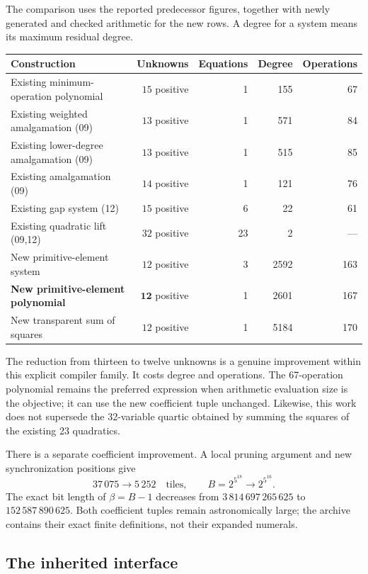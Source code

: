 The comparison uses the reported predecessor figures, together with
newly generated and checked arithmetic for the new rows.  A degree for
a system means its maximum residual degree.
\begin{center}\small
\begin{tabular}{>{\raggedright\arraybackslash}p{54mm}rrrr}
\toprule
Construction & Unknowns & Equations & Degree & Operations\\
\midrule
Existing minimum-operation polynomial & $15$ positive & 1 & 155 & 67\\
Existing weighted amalgamation (09) & $13$ positive & 1 & 571 & 84\\
Existing lower-degree amalgamation (09) & $13$ positive & 1 & 515 & 85\\
Existing amalgamation (09) & $14$ positive & 1 & 121 & 76\\
Existing gap system (12) & $15$ positive & 6 & 22 & 61\\
Existing quadratic lift (09,12) & $32$ positive & 23 & 2 & ---\\
\midrule
New primitive-element system & $12$ positive & 3 & 2592 & 163\\
\textbf{New primitive-element polynomial} & $\mathbf{12}$ positive & 1 & 2601 & 167\\
New transparent sum of squares & $12$ positive & 1 & 5184 & 170\\
\bottomrule
\end{tabular}
\end{center}

The reduction from thirteen to twelve unknowns is a genuine improvement
within this explicit compiler family.  It costs degree and operations.
The 67-operation polynomial remains the preferred expression when
arithmetic evaluation size is the objective; it can use the new
coefficient tuple unchanged.  Likewise, this work does not supersede
the 32-variable quartic obtained by summing the squares of the existing
23 quadratics.

There is a separate coefficient improvement.  A local pruning argument
and new synchronization positions give
\[
37\,075\longrightarrow 5\,252\quad\text{tiles},\qquad
B=2^{5^{18}}\longrightarrow 2^{5^{16}}.
\]
The exact bit length of $\beta=B-1$ decreases from
$3\,814\,697\,265\,625$ to $152\,587\,890\,625$.
Both coefficient tuples remain astronomically large; the archive
contains their exact finite definitions, not their expanded numerals.

\subsection{The inherited interface}

